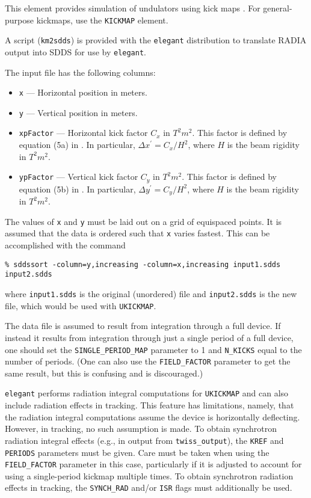 This element provides simulation of undulators using kick maps \cite{Elleaume1992}.
For general-purpose kickmaps, use the \verb|KICKMAP| element.

A script (\verb|km2sdds|) is provided with the {\tt elegant}
distribution to translate RADIA \cite{radia} output into SDDS for use by
\verb|elegant|.

The input file has the following columns:
\begin{itemize}
\item \verb|x| --- Horizontal position in meters.
\item \verb|y| --- Vertical position in meters.
\item \verb|xpFactor| --- Horizontal kick factor $C_x$ in $T^2 m^2$.  This factor is defined by
equation (5a) in \cite{Elleaume1992}.  In particular, $\Delta x^\prime = C_x/H^2$, where
$H$ is the beam rigidity in  $T^2 m^2$.
\item \verb|ypFactor| --- Vertical kick factor $C_y$ in $T^2 m^2$. This factor is defined by
equation (5b) in \cite{Elleaume1992}.  In particular, $\Delta y^\prime = C_y/H^2$, where
$H$ is the beam rigidity in  $T^2 m^2$.
\end{itemize}
The values of \verb|x| and \verb|y| must be laid out on a grid of equispaced points.
It is assumed that the data is ordered such that \verb|x| varies fastest.  This can be
accomplished with the command
\begin{verbatim}
% sddssort -column=y,increasing -column=x,increasing input1.sdds input2.sdds
\end{verbatim}
where \verb|input1.sdds| is the original (unordered) file and \verb|input2.sdds| is the
new file, which would be used with \verb|UKICKMAP|.

The data file is assumed to result from integration through a full device. 
If instead it results from integration through just a single period of a full device, one
should set the \verb|SINGLE_PERIOD_MAP| parameter to 1 and \verb|N_KICKS| equal to the
number of periods.  (One can also use the \verb|FIELD_FACTOR| parameter to get the same
result, but this is confusing and is discouraged.)

{\tt elegant} performs radiation integral computations
for \verb|UKICKMAP| and can also include radiation effects in
tracking.  This feature has limitations, namely, that the radiation
integral computations assume the device is horizontally deflecting.
However, in tracking, no such assumption is made.  
To obtain synchrotron radiation integral effects (e.g., in output from \verb|twiss_output|), 
the \verb|KREF| and \verb|PERIODS| parameters must be given.
Care must be taken when using the \verb|FIELD_FACTOR| parameter in this case, particularly if
it is adjusted to account for using a single-period kickmap multiple times.
To obtain synchrotron radiation effects in tracking, the \verb|SYNCH_RAD| and/or \verb|ISR| flags
must additionally be used.

